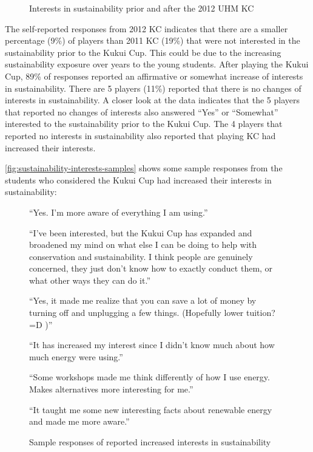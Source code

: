 \begin{figure}[htbp]
	\centering
		\caption{Interests in sustainability prior and after the 2012 UHM KC}
		\label{fig:effect-prior-after-2012}
\end{figure}

The self-reported responses from 2012 KC indicates that there are a smaller percentage (9\%) of players than 2011 KC (19\%) that were not interested in the sustainability prior to the Kukui Cup. This could be due to the increasing sustainability exposure over years to the young students.  After playing the Kukui Cup, 89\% of responses reported an affirmative or somewhat increase of interests in sustainability. There are 5 players (11\%)  reported that there is no changes of interests in sustainability. A closer look at the data indicates that the 5 players that reported no changes of interests also answered ``Yes'' or ``Somewhat'' interested to the sustainability prior to the Kukui Cup. The 4 players that reported no interests in sustainability also reported that playing KC had increased their interests.

\autoref{fig:sustainability-interests-samples} shows some sample responses from the students who considered the Kukui Cup had increased their interests in sustainability:
 
 \begin{figure}[ht!]
\begin{mybox}
\begin{compactenum}
	\item ``Yes. I'm more aware of everything I am using.''
	\item ``I've been interested, but the Kukui Cup has expanded and broadened my mind on what else I can be doing to help with conservation and sustainability. I think people are genuinely concerned, they just don't know how to exactly conduct them, or what other ways they can do it.''
	\item ``Yes, it made me realize that you can save a lot of money by turning off and unplugging a few things. (Hopefully lower tuition? =D )''
	\item ``It has increased my interest since I didn't know much about how much energy were using.''
	\item ``Some workshops made me think differently of how I use energy. Makes alternatives more interesting for me.''
	\item ``It taught me some new interesting facts about renewable energy and made me more aware.''	
\end{compactenum}
\end{mybox}
\caption{Sample responses of reported increased interests in sustainability}
\label{fig:sustainability-interests-samples}  
\end{figure}


